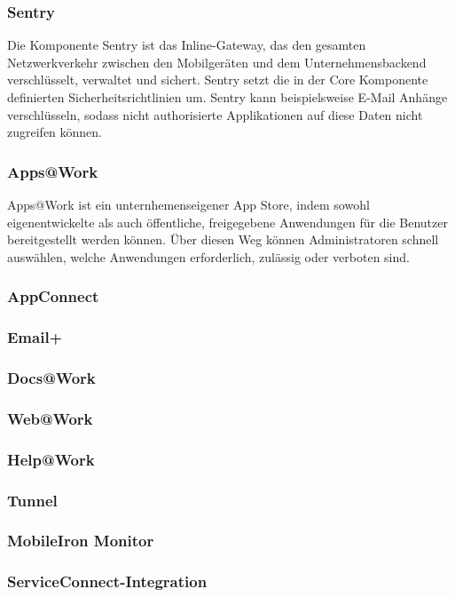 \subsubsection {Sentry}
Die Komponente Sentry ist das Inline-Gateway, das den gesamten Netzwerkverkehr zwischen den Mobilgeräten und dem Unternehmensbackend verschlüsselt, verwaltet und sichert. Sentry setzt die in der Core Komponente definierten Sicherheitsrichtlinien um. Sentry kann beispielsweise E-Mail Anhänge verschlüsseln, sodass nicht authorisierte Applikationen auf diese Daten nicht zugreifen können. 

\subsubsection {Apps@Work}
Apps@Work ist ein unternhemenseigener App Store, indem sowohl eigenentwickelte als auch öffentliche, freigegebene Anwendungen für die Benutzer bereitgestellt werden können. Über diesen Weg können Administratoren schnell auswählen, welche Anwendungen erforderlich, zulässig oder verboten sind. 
\subsubsection {AppConnect}
\subsubsection {Email+}
\subsubsection {Docs@Work}
\subsubsection {Web@Work}
\subsubsection {Help@Work}
\subsubsection {Tunnel}
\subsubsection {MobileIron Monitor}
\subsubsection {ServiceConnect-Integration}

